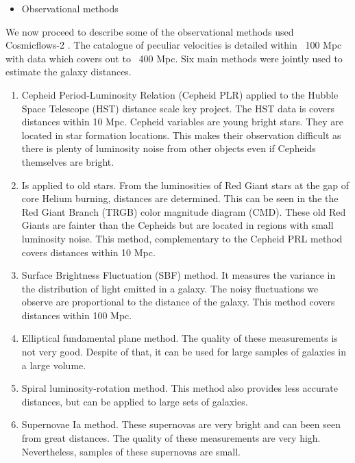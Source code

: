 \documentclass[12pt]{article}
\begin{document}
\begin{itemize}
\item Observational methods
\end{itemize}
\begin{par}
We now proceed to describe some of the observational
 methods used Cosmicflows-2
  \cite{tully_cosmicflows-2_2013}. The catalogue of
   peculiar velocities is detailed within ~100 Mpc with
    data which covers out to ~400 Mpc. Six main methods
     were jointly used to estimate the galaxy
      distances.	\\
 \begin{enumerate}
 \item Cepheid Period-Luminosity
      Relation (Cepheid PLR) applied to the Hubble
       Space Telescope (HST) distance scale key
        project. The HST data is covers distances
         within 10 Mpc. Cepheid variables are young
          bright stars. They are located in star
           formation locations. 
           This makes their observation
            difficult as there is plenty of luminosity
             noise from other objects even if Cepheids
              themselves are bright.\\
              
  \item Is applied to old stars. From the
 luminosities of Red Giant stars at the gap of core
  Helium burning, distances are determined. This can be
   seen in the the Red Giant Branch (TRGB) color
    magnitude diagram (CMD). These old Red Giants are
     fainter than the Cepheids but are located in
      regions with small luminosity noise. This method,
       complementary to the Cepheid PRL method covers
        distances within 10 Mpc.\\
        
  \item Surface Brightness Fluctuation (SBF) method. It
   measures the variance in the distribution of light
    emitted in a galaxy. The noisy fluctuations we
     observe are proportional to the distance of the
      galaxy. This method covers distances within 100
       Mpc.\\
  
  \item Elliptical fundamental plane
 method. The quality of these measurements is not very
  good. Despite of that, it can be used for large
   samples of galaxies in a large volume.\\
   
   \item Spiral luminosity-rotation
 method. This method also provides less accurate
  distances, but can be applied to large sets of
   galaxies.\\
   
  \item Supernovae Ia method.
These supernovas are very bright and can been seen from
 great distances. The quality of these measurements are
  very high. Nevertheless, samples of these supernovas
   are small.
\end{enumerate}     

\end{par}
\end{document}
